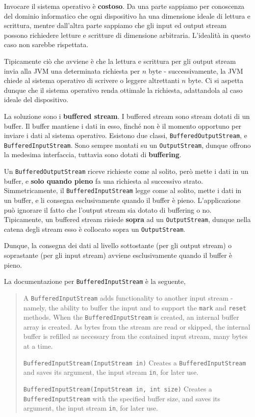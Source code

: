\documentclass[\fontsizeclass,twocolumn]{\classname}
\theoremstyle{definition}
\theoremstyle{definition}
\begin{document}
Invocare il sistema operativo è \textbf{costoso}.
Da una parte sappiamo per conoscenza del dominio informatico che ogni
dispositivo ha una dimensione ideale di lettura e scrittura, mentre dall'altra
parte sappiamo che gli input ed output stream possono richiedere letture e
scritture di dimensione arbitraria. L'idealità in questo caso non sarebbe
rispettata. 

Tipicamente ciò che avviene è che la lettura e scrittura per gli output stream
invia alla JVM una determinata richiesta per $n$ byte \-- successivamente, la
JVM chiede al sistema operativo di scrivere o leggere altrettanti $n$ byte. Ci
si aspetta dunque che il sistema operativo renda ottimale la richiesta,
adattandola al caso ideale del dispositivo.

La soluzione sono i \textbf{buffered stream}. I buffered stream sono stream
dotati di un buffer. Il buffer mantiene i dati in esso, finché non è il momento
opportuno per inviare i dati al sistema operativo. Esistono due classi,
\texttt{BufferedOutputStream}, e \texttt{BufferedInputStream}. Sono sempre
montati su un \texttt{Output\-Stream}, dunque offrono la medesima interfaccia,
tuttavia sono dotati di \textbf{buffering}. 

Un \texttt{BufferedOutputStream} riceve richieste come al solito, però mette i
dati in un buffer, e \textbf{solo quando pieno} fa una richiesta al successivo
strato. Simmetricamente, il \texttt{BufferedInputStream} legge come al solito,
mette i dati in un buffer, e li consegna esclusivamente quando il buffer è
pieno. L'applicazione può ignorare il fatto che l'output stream sia dotato di
buffering o no. Tipicamente, un buffered stream risiede \textbf{sopra} ad un
\texttt{Output\-Stream}, dunque nella catena degli stream esso è collocato sopra
un \texttt{Output\-Stream}.

Dunque, la consegna dei dati al livello sottostante (per gli output stream) o
soprastante (per gli input stream) avviene esclusivamente quando il buffer è
pieno.

La documentazione per \texttt{BufferedInputStream} è la seguente,

\begin{quote}
    \footnotesize{A \texttt{BufferedInputStream} adds functionality to another input
        stream \-- namely, the ability to buffer the input and to support the \texttt{mark} and
        \texttt{reset} methods. When the \texttt{BufferedInputStream} is created, an internal buffer
array is created. As bytes from the stream are read or skipped, the internal
buffer is refilled as necessary from the contained input stream, many bytes at
a time.

\texttt{BufferedInputStream(InputStream in)} 	Creates a \texttt{BufferedInputStream}
and saves its argument, the input stream \texttt{in}, for later use.

\texttt{BufferedInputStream(InputStream in, int size)} 	Creates a
\texttt{BufferedInputStream} with the specified buffer size, and saves its argument, the
input stream \texttt{in}, for later use.
}
\end{quote}
\end{document}
